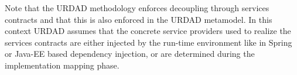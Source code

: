 \normalsize
Note that the URDAD methodology enforces decoupling through services contracts and that this is also enforced in the URDAD metamodel. In this context URDAD assumes that the concrete service providers used to realize the services contracts are either injected by the run-time environment like in Spring or Java-EE based dependency injection, or are determined during the implementation mapping phase.


